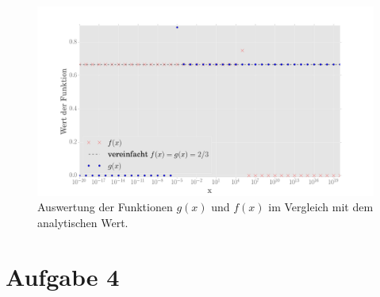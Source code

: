 \begin{figure}
\centering
\includegraphics[width=\textwidth]{plot3.png}
\caption{Auswertung der Funktionen $g(x)$ und $f(x)$ im Vergleich mit dem analytischen Wert.}
\end{figure}


\section*{Aufgabe 4}

